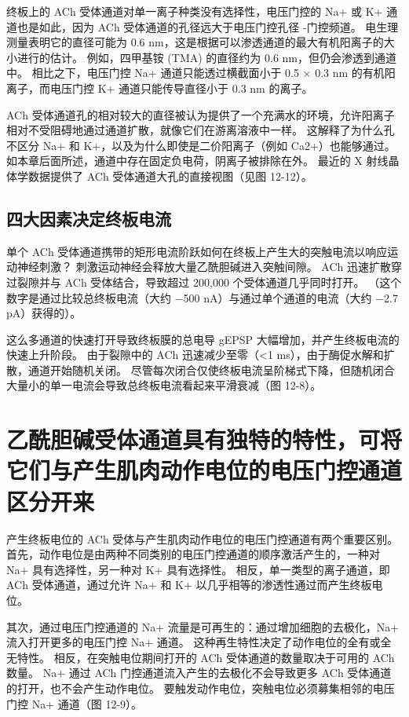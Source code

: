 终板上的 ACh 受体通道对单一离子种类没有选择性，电压门控的 Na+ 或 K+ 通道也是如此，因为 ACh 受体通道的孔径远大于电压门控孔径 -门控频道。 电生理测量表明它的直径可能为 0.6 nm，这是根据可以渗透通道的最大有机阳离子的大小进行的估计。 例如，四甲基铵 (TMA) 的直径约为 0.6 nm，但仍会渗透到通道中。 相比之下，电压门控 Na+ 通道只能透过横截面小于 0.5 × 0.3 nm 的有机阳离子，而电压门控 K+ 通道只能传导直径小于 0.3 nm 的离子。

ACh 受体通道孔的相对较大的直径被认为提供了一个充满水的环境，允许阳离子相对不受阻碍地通过通道扩散，就像它们在游离溶液中一样。 这解释了为什么孔不区分 Na+ 和 K+，以及为什么即使是二价阳离子（例如 Ca2+）也能够通过。 如本章后面所述，通道中存在固定负电荷，阴离子被排除在外。 最近的 X 射线晶体学数据提供了 ACh 受体通道大孔的直接视图（见图 12-12）。

\subsection{四大因素决定终板电流}

单个 ACh 受体通道携带的矩形电流阶跃如何在终板上产生大的突触电流以响应运动神经刺激？ 刺激运动神经会释放大量乙酰胆碱进入突触间隙。 ACh 迅速扩散穿过裂隙并与 ACh 受体结合，导致超过 200,000 个受体通道几乎同时打开。 （这个数字是通过比较总终板电流（大约 −500 nA）与通过单个通道的电流（大约 −2.7 pA）获得的）。

这么多通道的快速打开导致终板膜的总电导 gEPSP 大幅增加，并产生终板电流的快速上升阶段。 由于裂隙中的 ACh 迅速减少至零（<1 ms），由于酶促水解和扩散，通道开始随机关闭。 尽管每次闭合仅使终板电流呈阶梯式下降，但随机闭合大量小的单一电流会导致总终板电流看起来平滑衰减（图 12-8）。




\section{乙酰胆碱受体通道具有独特的特性，可将它们与产生肌肉动作电位的电压门控通道区分开来}

产生终板电位的 ACh 受体与产生肌肉动作电位的电压门控通道有两个重要区别。 首先，动作电位是由两种不同类别的电压门控通道的顺序激活产生的，一种对 Na+ 具有选择性，另一种对 K+ 具有选择性。 相反，单一类型的离子通道，即 ACh 受体通道，通过允许 Na+ 和 K+ 以几乎相等的渗透性通过而产生终板电位。

其次，通过电压门控通道的 Na+ 流量是可再生的：通过增加细胞的去极化，Na+ 流入打开更多的电压门控 Na+ 通道。 这种再生特性决定了动作电位的全有或全无特性。 相反，在突触电位期间打开的 ACh 受体通道的数量取决于可用的 ACh 数量。 Na+ 通过 ACh 门控通道流入产生的去极化不会导致更多 ACh 受体通道的打开，也不会产生动作电位。 要触发动作电位，突触电位必须募集相邻的电压门控 Na+ 通道（图 12-9）。

